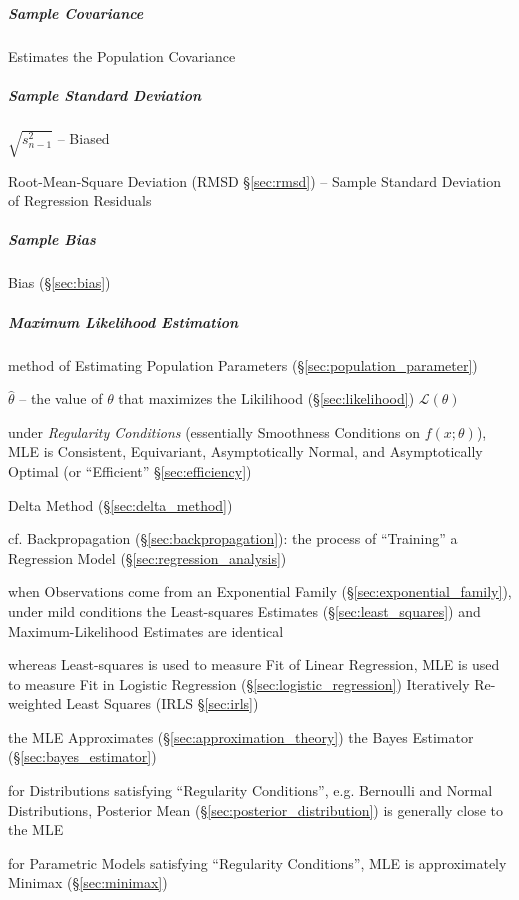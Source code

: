 \subparagraph{Sample Covariance}\label{sec:sample_covariance}\hfill

Estimates the Population Covariance



\subparagraph{Sample Standard Deviation}
\label{sec:sample_standard_deviation}\hfill

$\sqrt{s^2_{n-1}}$ -- Biased

\fist Root-Mean-Square Deviation (RMSD \S\ref{sec:rmsd}) -- Sample Standard
Deviation of Regression Residuals



\subparagraph{Sample Bias}\label{sec:sample_bias}\hfill

Bias (\S\ref{sec:bias})



\subparagraph{Maximum Likelihood Estimation}\label{sec:mle}\hfill

method of Estimating Population Parameters (\S\ref{sec:population_parameter})

$\hat{\theta}$ -- the value of $\theta$ that maximizes the Likilihood
(\S\ref{sec:likelihood}) $\mathcal{L}(\theta)$

under \emph{Regularity Conditions} (essentially Smoothness Conditions on
$f(x; \theta)$), MLE is Consistent, Equivariant, Asymptotically Normal, and
Asymptotically Optimal (or ``Efficient'' \S\ref{sec:efficiency})

\fist Delta Method (\S\ref{sec:delta_method})

cf. Backpropagation (\S\ref{sec:backpropagation}): the process of ``Training'' a
Regression Model (\S\ref{sec:regression_analysis})

when Observations come from an Exponential Family
(\S\ref{sec:exponential_family}), under mild conditions the Least-squares
Estimates (\S\ref{sec:least_squares}) and Maximum-Likelihood Estimates are
identical

whereas Least-squares is used to measure Fit of Linear Regression, MLE is used
to measure Fit in Logistic Regression (\S\ref{sec:logistic_regression}) \fist
Iteratively Re-weighted Least Squares (IRLS \S\ref{sec:irls})

the MLE Approximates (\S\ref{sec:approximation_theory}) the Bayes Estimator
(\S\ref{sec:bayes_estimator})

for Distributions satisfying ``Regularity Conditions'', e.g. Bernoulli and
Normal Distributions, Posterior Mean (\S\ref{sec:posterior_distribution}) is
generally close to the MLE

for Parametric Models satisfying ``Regularity Conditions'', MLE is approximately
Minimax (\S\ref{sec:minimax})

